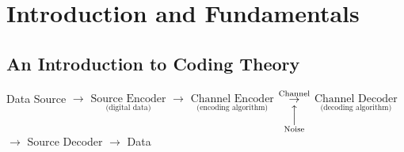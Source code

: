 \chapter{Introduction and Fundamentals}
\section{An Introduction to Coding Theory}

Data Source
$ \rightarrow $
$ \underset{\text{(digital data)}}{\text{Source Encoder}} $
$ \rightarrow $
$ \underset{\text{(encoding algorithm)}}{\text{Channel Encoder}} $
$ \underset{\overset{\Big\uparrow}{\text{Noise}}}{\overset{\text{Channel}}{\rightarrow}} $
$ \underset{\text{(decoding algorithm)}}{\text{Channel Decoder}} $
$ \rightarrow $
Source Decoder $
    \rightarrow $
Data

